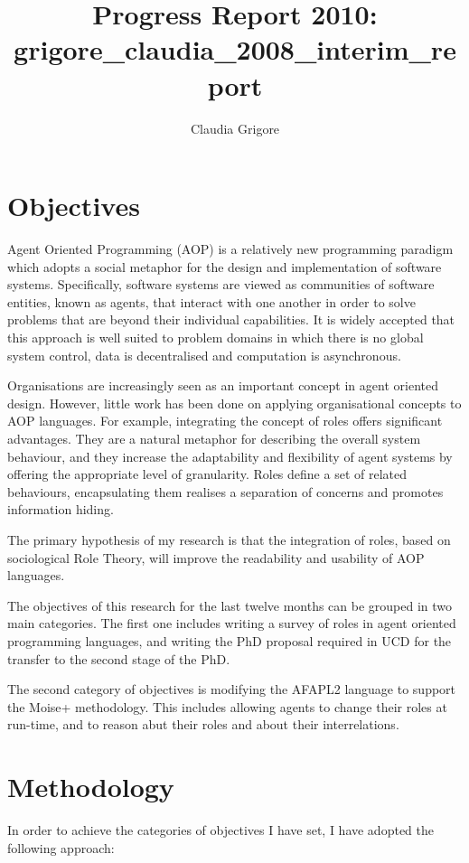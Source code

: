 \documentclass{article}
\title{Progress Report 2010: grigore\_claudia\_2008\_interim\_report}
\author{Claudia Grigore}
\begin{document}
 \maketitle

\section{Objectives}
Agent Oriented Programming (AOP) is a relatively new programming paradigm which
adopts a social metaphor for the design and implementation of software systems.
Specifically, software systems are viewed as communities of software entities,
known as agents, that interact with one another in order to solve problems that
are beyond their individual capabilities. It is widely accepted that this
approach is well suited to problem domains in which there is no global system
control, data is decentralised and computation is asynchronous.

Organisations are increasingly seen as an important concept in agent oriented
design. However, little work has been done on applying organisational concepts
to AOP languages. For example, integrating the concept of roles offers
significant advantages. They are a natural metaphor for describing the overall
system behaviour, and they increase the adaptability and flexibility of agent
systems by offering the appropriate level of granularity. Roles define a set of
related behaviours, encapsulating them realises a separation of concerns and
promotes information hiding.

The primary hypothesis of my research is that the integration of roles, based
on sociological Role Theory, will improve the readability and usability of AOP
languages. 

The objectives of this research for the last twelve months can be grouped in
two main categories. The first one includes writing a survey of roles in agent
oriented programming languages, and writing the PhD proposal required in UCD
for the transfer to the second stage of the PhD. 

The second category of objectives is modifying the AFAPL2 language to support
the Moise+ methodology. This includes allowing agents to change their roles at
run-time, and to reason abut their roles and about their interrelations.

\section{Methodology}
In order to achieve the categories of objectives I have set, I have adopted the
following approach:
\end{document}
